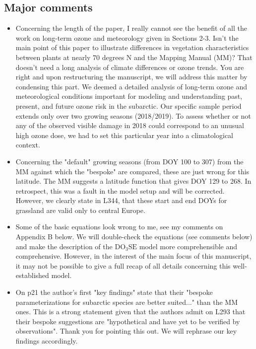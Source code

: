 \documentclass{scrartcl}
\begin{document}
\subsection*{Major comments} 
\begin{itemize}
    
    \item {\color{blue}Concerning the length of the paper, I really cannot see the benefit of all the work on long-term ozone and meteorology given in Sections 2-3. Isn't the main point of this paper to illustrate differences in vegetation characteristics between plants at nearly 70 degrees N and the Mapping Manual (MM)? That doesn't need a long analysis of climate differences or ozone trends.}
    You are right and upon restructuring the manuscript, we will address this matter by condensing this part. We deemed a detailed analysis of long-term ozone and meteorological conditions important for modeling and understanding past, present, and future ozone risk in the subarctic. Our specific sample period extends only over two growing seasons (2018/2019). To assess whether or not any of the observed visible damage in 2018 could correspond to an unusual high ozone dose, we had to set this particular year into a climatological context. 
    
    \item {\color{blue}Concerning the "default" growing seasons (from DOY 100 to 307) from the MM against which the "bespoke" are compared, these are just wrong for this latitude. The MM suggests a latitude function that gives DOY 129 to 268.}
    In retrospect, this was a fault in the model setup and will be corrected. However, we clearly state in L344, that these start and end DOYs for grassland are valid only to central Europe.
    
    \item {\color{blue}Some of the basic equations look wrong to me, see my comments on Appendix B below.}
    We will double-check the equations (see comments below) and make the description of the $\mathrm{DO_3SE}$ model more comprehensible and comprehensive. However, in the interest of the main focus of this manuscript, it may not be possible to give a full recap of all details concerning this well-established model.
    
    \item {\color{blue}On p21 the author's first "key findings" state that their "bespoke parameterizations for subarctic species are better suited..." than the MM ones. This is a strong statement given that the authors admit on L293 that their bespoke suggestions are "hypothetical and have yet to be verified by observations".}
    Thank you for pointing this out. We will rephrase our key findings accordingly.
\end{itemize}
\end{document}
